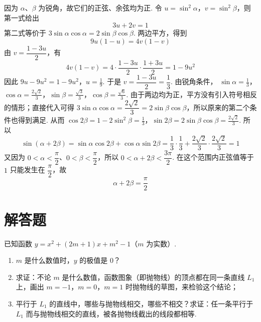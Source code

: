 \documentclass[UTF8,a4paper,oneside,11pt]{ctexbook}
\begin{document}
\begin{solution}
因为 \(\alpha\)、\(\beta\) 为锐角，故它们的正弦、余弦均为正. 令 \(u=\sin^{2}\alpha\)，\(v=\sin^{2}\beta\)，则第一式给出
\[
3u+2v=1
\]
第二式等价于 \(3\sin\alpha\cos\alpha=2\sin\beta\cos\beta\). 两边平方，得到
\[
9u(1-u)=4v(1-v)
\]
由 \(v=\dfrac{1-3u}{2}\)，有
\[
4v(1-v)=4\cdot\frac{1-3u}{2}\cdot\frac{1+3u}{2}=1-9u^{2}
\]
因此
\(9u-9u^{2}=1-9u^{2}\)，\(u=\frac{1}{9}\).
于是 \(v=\dfrac{1-3u}{2}=\dfrac{1}{3}\). 由锐角条件，
\(\sin\alpha=\frac{1}{3}\)，\(\cos\alpha=\frac{2\sqrt{2}}{3}\)，\(\sin\beta=\frac{\sqrt{3}}{3}\)，\(\cos\beta=\frac{\sqrt{6}}{3}\).
由于两边均为正，平方没有引入符号相反的情形；直接代入可得
\(3\sin\alpha\cos\alpha=\dfrac{2\sqrt{2}}{3}=2\sin\beta\cos\beta\)，所以原来的第二个条件也得到满足.
从而
\(\cos2\beta=1-2\sin^{2}\beta=\frac{1}{3}\)，\(\sin2\beta=2\sin\beta\cos\beta=\frac{2\sqrt{2}}{3}\).
所以
\[
\sin(\alpha+2\beta)=\sin\alpha\cos2\beta+\cos\alpha\sin2\beta
=\frac{1}{3}\cdot\frac{1}{3}+\frac{2\sqrt{2}}{3}\cdot\frac{2\sqrt{2}}{3}=1
\]
又因为 \(0<\alpha<\dfrac{\pi}{2}\)、\(0<\beta<\dfrac{\pi}{2}\)，所以 \(0<\alpha+2\beta<\dfrac{3\pi}{2}\). 在这个范围内正弦值等于 \(1\) 只能发生在 \(\dfrac{\pi}{2}\)，故
\[
\alpha+2\beta=\frac{\pi}{2}
\]
\end{solution}

\section{解答题}

\begin{problem}
已知函数 \(y=x^{2}+(2m+1)x+m^{2}-1\)（\(m\) 为实数）.

\begin{enumerate}
\item \(m\) 是什么数值时，\(y\) 的极值是 \(0\)？
\item 求证：不论 \(m\) 是什么数值，函数图象（即抛物线）的顶点都在同一条直线 \(L_{1}\) 上，画出 \(m=-1\)，\(m=0\)，\(m=1\) 时抛物线的草图，来检验这个结论；
\item 平行于 \(L_{1}\) 的直线中，哪些与抛物线相交，哪些不相交？求证：任一条平行于 \(L_{1}\) 而与抛物线相交的直线，被各抛物线截出的线段都相等.
\end{enumerate}
\end{problem}
\end{document}
